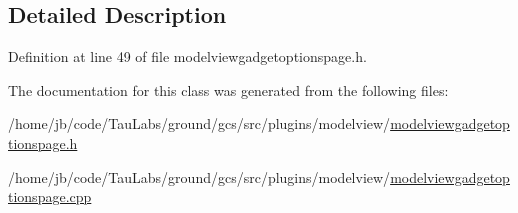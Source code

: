 \subsection{\-Detailed \-Description}


\-Definition at line 49 of file modelviewgadgetoptionspage.\-h.



\-The documentation for this class was generated from the following files\-:\begin{DoxyCompactItemize}
\item 
/home/jb/code/\-Tau\-Labs/ground/gcs/src/plugins/modelview/\hyperlink{modelviewgadgetoptionspage_8h}{modelviewgadgetoptionspage.\-h}\item 
/home/jb/code/\-Tau\-Labs/ground/gcs/src/plugins/modelview/\hyperlink{modelviewgadgetoptionspage_8cpp}{modelviewgadgetoptionspage.\-cpp}\end{DoxyCompactItemize}

